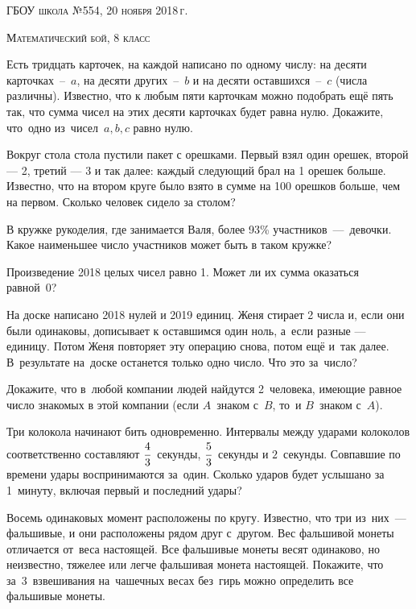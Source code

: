 \begin{flushright}
\textsc{ГБОУ школа №554, 20 ноября 2018\,г.}
\end{flushright}

\begin{center}
\LARGE \textsc{Математический бой, 8 класс}
\end{center}

 Есть тридцать карточек, на каждой написано по одному числу: на десяти карточках~–~$a$,  на десяти других~–~$b$ и на десяти оставшихся~–~$c$ (числа  различны). Известно, что к любым пяти карточкам можно подобрать ещё пять так, что сумма чисел на этих десяти карточках будет равна нулю. Докажите, что~одно из~чисел~$a, b, c$ равно нулю.

 Вокруг стола стола пустили пакет с орешками. Первый взял один орешек, второй — 2, третий — 3 и так далее: каждый следующий брал на 1 орешек больше. Известно, что на втором круге было взято в сумме на 100 орешков больше, чем на первом. Сколько человек сидело за столом?



 В кружке рукоделия, где занимается Валя, более 93\% участников~—~девочки. Какое наименьшее число участников может быть в таком кружке?

 Произведение 2018 целых чисел равно 1. Может ли их сумма оказаться равной~0?


 На доске написано 2018 нулей и 2019 единиц. Женя стирает 2 числа и, если они были одинаковы, дописывает к оставшимся один ноль, а~если разные — единицу. Потом Женя повторяет эту операцию снова, потом ещё и~так далее. В~результате на~доске останется только одно число. Что это за~число?

 Докажите, что в~любой компании людей найдутся 2~человека, имеющие равное число знакомых в этой компании (если $A$~знаком с~$B$, то~и $B$~знаком с~$A$).

 Три колокола начинают бить одновременно. Интервалы между ударами колоколов соответственно составляют $\cfrac43$~секунды, $\cfrac53$~секунды и $2$~секунды. Совпавшие по времени удары воспринимаются за~один. Сколько ударов будет услышано за 1~минуту, включая первый и последний удары?

 Восемь одинаковых момент расположены по кругу. Известно, что три из~них~— фальшивые, и они расположены рядом друг с~другом. Вес фальшивой монеты отличается от~веса настоящей. Все фальшивые монеты весят одинаково, но неизвестно, тяжелее или легче фальшивая монета настоящей. Покажите, что за~3~взвешивания на~чашечных весах без~гирь можно определить все фальшивые монеты.
